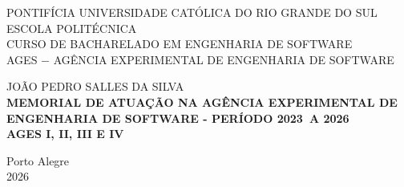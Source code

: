 \author{Gustavo}

\def\autor{\uppercase{João Pedro Salles da Silva}}
\def\inicio{2023}
\def\fim{2026}
\def\ages{I, II, III e IV}
\def\local{Porto Alegre}
\def\ano{2026}

\begin{capa}
  \centering
    \uppercase{
      PONTIFÍCIA UNIVERSIDADE CATÓLICA DO RIO GRANDE DO SUL\\
      ESCOLA POLITÉCNICA\\
      CURSO DE BACHARELADO EM ENGENHARIA DE SOFTWARE\\
      AGES $-$ AGÊNCIA EXPERIMENTAL DE ENGENHARIA DE SOFTWARE\\
      }

    \vfill
    \autor\\
    \vfill
    \textbf{
      \uppercase{
        Memorial de atuação na Agência Experimental de Engenharia de Software 
        {-} Período \inicio\ a \fim\
        \\AGES \ages\
      }
    }
    
    \vfill

    \vfill
    \local\\
    \ano\
  \end{capa}
